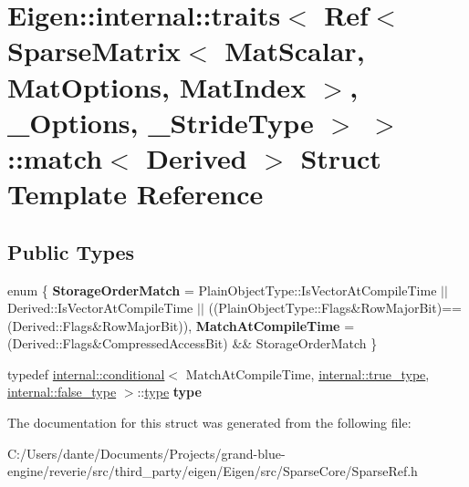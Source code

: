 \hypertarget{struct_eigen_1_1internal_1_1traits_3_01_ref_3_01_sparse_matrix_3_01_mat_scalar_00_01_mat_optionsc6ef0ce4e339306d76a1e27f17721ded}{}\section{Eigen\+::internal\+::traits$<$ Ref$<$ Sparse\+Matrix$<$ Mat\+Scalar, Mat\+Options, Mat\+Index $>$, \+\_\+\+Options, \+\_\+\+Stride\+Type $>$ $>$\+::match$<$ Derived $>$ Struct Template Reference}
\label{struct_eigen_1_1internal_1_1traits_3_01_ref_3_01_sparse_matrix_3_01_mat_scalar_00_01_mat_optionsc6ef0ce4e339306d76a1e27f17721ded}
\subsection*{Public Types}
\begin{DoxyCompactItemize}
\item 
\mbox{\label{struct_eigen_1_1internal_1_1traits_3_01_ref_3_01_sparse_matrix_3_01_mat_scalar_00_01_mat_optionsc6ef0ce4e339306d76a1e27f17721ded_af6e666bc507cda90d15a836e2129f6d6}} 
enum \{ {\bfseries Storage\+Order\+Match} = Plain\+Object\+Type\+::Is\+Vector\+At\+Compile\+Time $\vert$$\vert$ Derived\+::Is\+Vector\+At\+Compile\+Time $\vert$$\vert$ ((Plain\+Object\+Type\+::Flags\&Row\+Major\+Bit)==(Derived\+::Flags\&Row\+Major\+Bit)), 
{\bfseries Match\+At\+Compile\+Time} = (Derived\+::Flags\&Compressed\+Access\+Bit) \&\& Storage\+Order\+Match
 \}
\item 
\mbox{\label{struct_eigen_1_1internal_1_1traits_3_01_ref_3_01_sparse_matrix_3_01_mat_scalar_00_01_mat_optionsc6ef0ce4e339306d76a1e27f17721ded_a56a976fd13a3fadcc937fb3030f492f0}} 
typedef \mbox{\hyperlink{struct_eigen_1_1internal_1_1conditional}{internal\+::conditional}}$<$ Match\+At\+Compile\+Time, \mbox{\hyperlink{struct_eigen_1_1internal_1_1true__type}{internal\+::true\+\_\+type}}, \mbox{\hyperlink{struct_eigen_1_1internal_1_1false__type}{internal\+::false\+\_\+type}} $>$\+::\mbox{\hyperlink{struct_eigen_1_1internal_1_1true__type}{type}} {\bfseries type}
\end{DoxyCompactItemize}


The documentation for this struct was generated from the following file\+:\begin{DoxyCompactItemize}
\item 
C\+:/\+Users/dante/\+Documents/\+Projects/grand-\/blue-\/engine/reverie/src/third\+\_\+party/eigen/\+Eigen/src/\+Sparse\+Core/Sparse\+Ref.\+h\end{DoxyCompactItemize}
